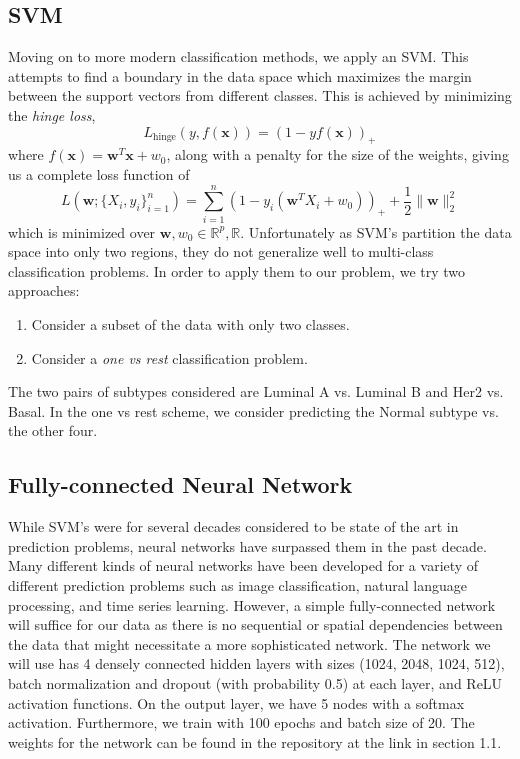 \documentclass{article}
\begin{document}
\subsection{SVM}
Moving on to more modern classification methods, we apply an SVM. This attempts to find a boundary in the data space which maximizes the margin between the support vectors from different classes. This is achieved by minimizing the \textit{hinge loss}, 
\[ L_{\mbox{hinge}}(y, f(\mathbf{x})) = (1 - yf(\mathbf{x}))_+ \]
where $f(\mathbf{x}) = \mathbf{w}^T \mathbf{x} + w_0$, along with a penalty for the size of the weights, giving us a complete loss function of
\[ L(\mathbf{w}; \{X_i, y_i\}_{i=1}^n) = \sum\limits_{i=1}^n (1 - y_i (\mathbf{w}^TX_i + w_0))_+ + \frac{1}{2}\|\mathbf{w}\|^2_2 \]
which is minimized over $\mathbf{w}, w_0 \in \mathbb{R}^p, \mathbb{R}$. Unfortunately as SVM's partition the data space into only two regions, they do not generalize well to multi-class classification problems. In order to apply them to our problem, we try two approaches:
\begin{enumerate}
\item Consider a subset of the data with only two classes.
\item Consider a \textit{one vs rest} classification problem.
\end{enumerate}
The two pairs of subtypes considered are Luminal A vs. Luminal B and Her2 vs. Basal. In the one vs rest scheme, we consider predicting the Normal subtype vs. the other four.

\subsection{Fully-connected Neural Network}
While SVM's were for several decades considered to be state of the art in prediction problems, neural networks have surpassed them in the past decade. Many different kinds of neural networks have been developed for a variety of different prediction problems such as image classification, natural language processing, and time series learning. However, a simple fully-connected network will suffice for our data as there is no sequential or spatial dependencies between the data that might necessitate a more sophisticated network.
\newline\newline The network we will use has 4 densely connected hidden layers with sizes (1024, 2048, 1024, 512), batch normalization and dropout (with probability 0.5) at each layer, and ReLU activation functions. On the output layer, we have 5 nodes with a softmax activation. Furthermore, we train with 100 epochs and batch size of 20. The weights for the network can be found in the repository at the link in section 1.1.
\end{document}
